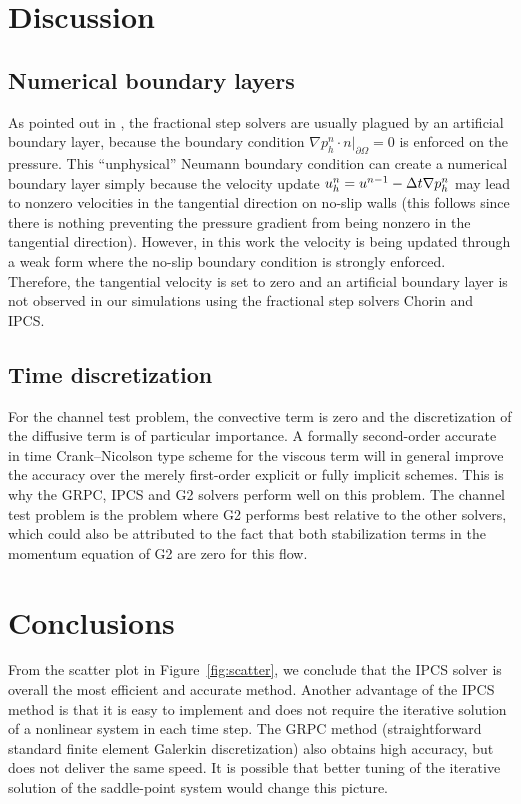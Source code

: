 \section{Discussion}
\label{Discussion}

\subsection{Numerical boundary layers}

As pointed out in \citet{GuermondMinevShen2006}, the fractional step
solvers are usually plagued by an artificial boundary layer, because
the boundary condition $ \nabla p^n_h \cdot n |_{\partial\Omega}=0$ is
enforced on the pressure. This ``unphysical'' Neumann boundary condition
can create a numerical boundary layer simply because the velocity
update $u^{n}_h=u^{n-1}-\Delta t\nabla p^n_h$ may lead to nonzero
velocities in the tangential direction on no-slip walls (this follows
since there is nothing preventing the pressure gradient from being
nonzero in the tangential direction). However, in this work the
velocity is being updated through a weak form where the no-slip
boundary condition is strongly enforced. Therefore, the tangential
velocity is set to zero and an artificial boundary layer is not
observed in our simulations using the fractional step solvers Chorin
and IPCS.

\subsection{Time discretization}

For the channel test problem, the convective term is zero and the
discretization of the diffusive term is of particular importance. A
formally second-order accurate in time Crank--Nicolson type scheme for
the viscous term will in general improve the accuracy over the merely
first-order explicit or fully implicit schemes. This is why the GRPC,
IPCS and G2 solvers perform well on this problem. The channel test
problem is the problem where G2 performs best relative to the other
solvers, which could also be attributed to the fact that both
stabilization terms in the momentum equation of G2 are zero for this
flow.

\section{Conclusions}

From the scatter plot in Figure~\ref{fig:scatter}, we conclude that
the IPCS solver is overall the most efficient and accurate
method. Another advantage of the IPCS method is that it is easy to
implement and does not require the iterative solution of a nonlinear
system in each time step. The GRPC method (straightforward standard
finite element Galerkin discretization) also obtains high accuracy,
but does not deliver the same speed. It is possible that better tuning
of the iterative solution of the saddle-point system would change this
picture.
